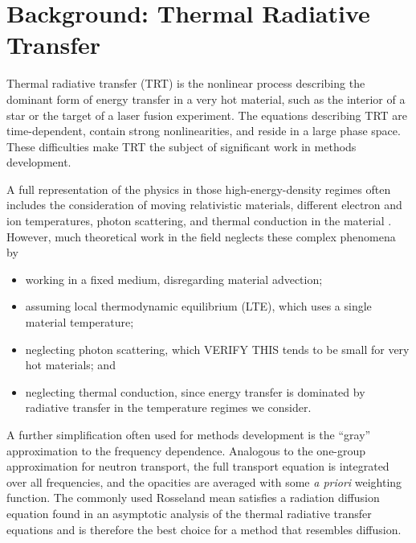 
\chapter{Background: Thermal Radiative Transfer}

Thermal radiative transfer (TRT) is the nonlinear process describing the
dominant form of energy transfer in a very hot material, such as the interior
of a star or the
target of a laser fusion experiment. The equations describing TRT are
time-dependent, contain strong nonlinearities, and reside in a large phase
space. These difficulties make TRT the subject of significant work in methods
development.

A full representation of the physics in
those high-energy-density regimes often includes the consideration of moving
relativistic materials, different electron and ion temperatures, photon
scattering, and thermal conduction in the material \cite{Mih1984}. However,
much theoretical work in the field neglects these complex phenomena by
\prelistpar
\begin{itemize}
  \item working in a fixed medium, disregarding material advection;
  \item assuming local thermodynamic equilibrium (LTE), which uses a single
    material temperature;
  \item neglecting photon scattering, which VERIFY THIS tends to be small for
    very hot materials; and
  \item neglecting thermal conduction, since energy transfer is dominated by
    radiative transfer in the temperature regimes we consider.
\end{itemize}

A further simplification often used for methods development is the ``gray''
approximation to the frequency dependence. Analogous to the one-group
approximation for neutron transport, the full transport equation is integrated
over all frequencies, and the opacities are averaged with some \emph{a priori}
weighting function. The commonly used Rosseland mean satisfies a radiation
diffusion equation found in an asymptotic analysis of the thermal radiative
transfer equations \cite{Lar1983a} and is therefore the best choice for a
method that resembles diffusion.

